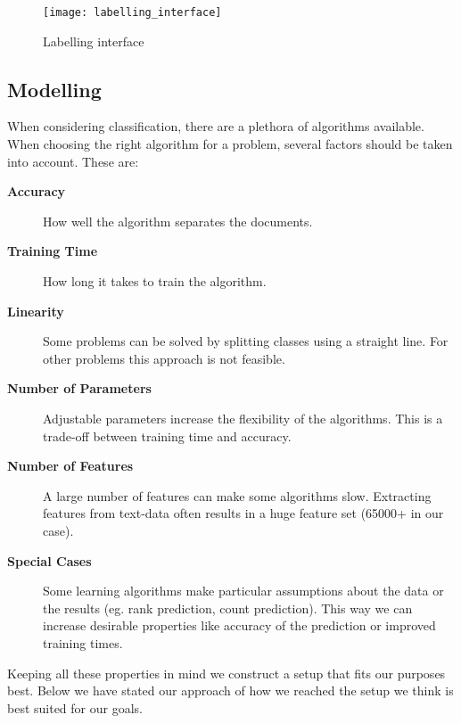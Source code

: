 \begin{figure}[H]
\centering
\texttt{[image: labelling\_interface]}
\caption{Labelling interface}
\label{fig:labelling_interface}
\end{figure}

\subsection{Modelling}
When considering classification, there are a plethora of algorithms available. When choosing the right algorithm for a problem, several factors should be taken into account\cite{MLCheatSheet}. These are:
    \begin{description}
        \item[\textbf{Accuracy}] How well the algorithm separates the documents.
        \item[\textbf{Training Time}] How long it takes to train the algorithm.
        \item[\textbf{Linearity}] Some problems can be solved by splitting classes using a straight line. For other problems this approach is not feasible.
        \item[\textbf{Number of Parameters}] Adjustable parameters increase the flexibility of the algorithms. This is a trade-off between training time and accuracy.
        \item[\textbf{Number of Features}] A large number of features can make some algorithms slow. Extracting features from text-data often results in a huge feature set (65000+ in our case).
        \item[\textbf{Special Cases}] Some learning algorithms make particular assumptions about the data or the results (eg. rank prediction, count prediction). This way we can increase desirable properties like accuracy of the prediction or improved training times. 
    \end{description}

Keeping all these properties in mind we construct a setup that fits our purposes best.
Below we have stated our approach of how we reached the setup we think is best suited for our goals.


